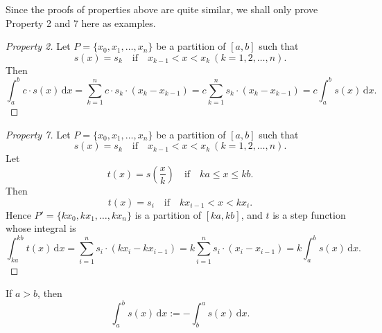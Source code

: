 \documentclass[a4paper]{ctexart}
\begin{document}
	\begin{myrmk}
		Since the proofs of properties above are quite similar, we shall only prove Property 2 and 7 here as examples.
	\end{myrmk}
	\begin{proof}[Property 2]
		Let \( P = \{x_0, x_1, \ldots, x_n\} \) be a partition of \([a, b]\) such that
		\[
		s(x) = s_k \quad \text{if}\quad x_{k-1} < x < x_k\ (k = 1, 2, \ldots, n). 
		\]
		Then
		\[
		\int_a^b c \cdot s(x) \, \mathrm{d}x
		= \sum_{k=1}^{n} c \cdot s_k \cdot (x_k - x_{k-1})
		= c \sum_{k=1}^{n} s_k \cdot (x_k - x_{k-1})
		= c \int_a^b s(x) \, \mathrm{d}x.
		\]
	\end{proof}
	\begin{proof}[Property 7]
	Let \( P = \{x_0, x_1, \ldots, x_n\} \) be a partition of \([a, b]\) such that
	\[
	s(x) = s_k \quad \text{if}\quad x_{k-1} < x < x_k\ (k = 1, 2, \ldots, n). 
	\]
	Let \[ t(x) = s\left(\frac x k\right) \quad  \text{if}\quad  ka \le x \le kb. \]  
	Then \[ t(x) = s_i \quad \text{if} \quad k x_{i-1} < x< k x_i.\]
	Hence \( P' = \{k x_0, k x_1, \ldots, k x_n\} \) is a partition of \([ka, kb]\), and \(t\) is a step function whose integral is  
	\[
	\int_{ka}^{kb} t(x) \, \mathrm{d}x
	= \sum_{i=1}^{n} s_i \cdot (k x_i - k x_{i-1})
	= k \sum_{i=1}^{n} s_i \cdot (x_i - x_{i-1})
	= k \int_a^b s(x) \, \mathrm{d}x.
	\]		
	\end{proof}
	\begin{mydef}
		If $a>b$, then
		\[
		\int_a^b s(x) \, \mathrm{d}x := -\int_b^a s(x)\, \mathrm{d}x.
		\]
	\end{mydef}
\end{document}
